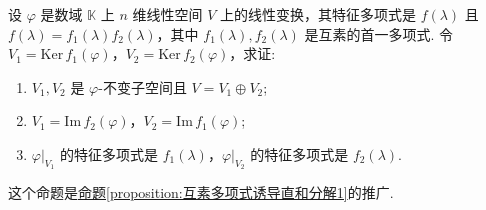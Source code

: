 \documentclass[../../main.tex]{subfiles}
\begin{document}
\begin{proposition}\label{proposition:Cayley-Hamilton定理诱导直和分解(互素多项式命题推广)}
设 $\varphi$ 是数域 $\mathbb{K}$ 上 $n$ 维线性空间 $V$ 上的线性变换，其特征多项式是 $f(\lambda)$ 且 $f(\lambda)=f_1(\lambda)f_2(\lambda)$，其中 $f_1(\lambda),f_2(\lambda)$ 是互素的首一多项式. 令 $V_1 = \mathrm{Ker}\,f_1(\varphi)$，$V_2 = \mathrm{Ker}\,f_2(\varphi)$，求证:
\begin{enumerate}[(1)]
\item  $V_1,V_2$ 是 $\varphi$-不变子空间且 $V = V_1\oplus V_2$;

\item $V_1 = \mathrm{Im}\,f_2(\varphi)$，$V_2 = \mathrm{Im}\,f_1(\varphi)$;

\item $\varphi|_{V_1}$ 的特征多项式是 $f_1(\lambda)$，$\varphi|_{V_2}$ 的特征多项式是 $f_2(\lambda)$.
\end{enumerate}
\end{proposition}
\begin{note}
这个命题是\hyperref[proposition:互素多项式诱导直和分解1]{命题\ref{proposition:互素多项式诱导直和分解1}}的推广. 
\end{note}
\end{document}
